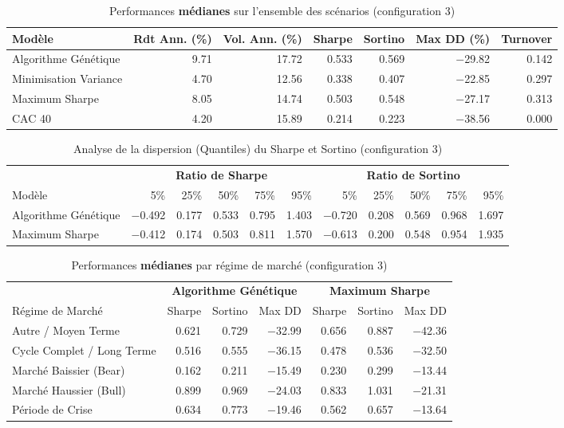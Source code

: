 \begin{table}[H]
\centering
\caption{Performances \textbf{médianes} sur l'ensemble des scénarios (configuration 3)\label{tab:overall_conf3}}
\footnotesize
\begin{tabular}{lrrrrrr}
\toprule
Modèle & \small Rdt Ann. (\%) & \small Vol. Ann. (\%) & \small Sharpe & \small Sortino & \small Max DD (\%) & \small Turnover \\
\midrule
Algorithme Génétique & 9.71 & 17.72 & 0.533 & 0.569 & $-$29.82 & 0.142 \\
Minimisation Variance & 4.70 & 12.56 & 0.338 & 0.407 & $-$22.85 & 0.297 \\
Maximum Sharpe & 8.05 & 14.74 & 0.503 & 0.548 & $-$27.17 & 0.313 \\
CAC 40 & 4.20 & 15.89 & 0.214 & 0.223 & $-$38.56 & 0.000 \\
\bottomrule
\end{tabular}
\end{table}

\begin{table}[H]
\centering
\caption{Analyse de la dispersion (Quantiles) du Sharpe et Sortino (configuration 3)\label{tab:quantiles_conf3}}
\footnotesize
\begin{tabular}{l|rrrrr|rrrrr}
\toprule
& \multicolumn{5}{c|}{\textbf{Ratio de Sharpe}} & \multicolumn{5}{c}{\textbf{Ratio de Sortino}} \\
Modèle & 5\% & 25\% & 50\% & 75\% & 95\% & 5\% & 25\% & 50\% & 75\% & 95\% \\
\midrule
Algorithme Génétique & $-$0.492 & 0.177 & 0.533 & 0.795 & 1.403 & $-$0.720 & 0.208 & 0.569 & 0.968 & 1.697 \\
Maximum Sharpe & $-$0.412 & 0.174 & 0.503 & 0.811 & 1.570 & $-$0.613 & 0.200 & 0.548 & 0.954 & 1.935 \\
\bottomrule
\end{tabular}
\end{table}

\begin{table}[H]
\centering
\caption{Performances \textbf{médianes} par régime de marché (configuration 3)\label{tab:regime_conf3}}
\footnotesize
\begin{tabular}{l|rrr|rrr}
\toprule
& \multicolumn{3}{c|}{\textbf{Algorithme Génétique}} & \multicolumn{3}{c}{\textbf{Maximum Sharpe}} \\
Régime de Marché & Sharpe & Sortino & Max DD & Sharpe & Sortino & Max DD \\
\midrule
Autre / Moyen Terme & 0.621 & 0.729 & $-$32.99 & 0.656 & 0.887 & $-$42.36 \\
Cycle Complet / Long Terme & 0.516 & 0.555 & $-$36.15 & 0.478 & 0.536 & $-$32.50 \\
Marché Baissier (Bear) & 0.162 & 0.211 & $-$15.49 & 0.230 & 0.299 & $-$13.44 \\
Marché Haussier (Bull) & 0.899 & 0.969 & $-$24.03 & 0.833 & 1.031 & $-$21.31 \\
Période de Crise & 0.634 & 0.773 & $-$19.46 & 0.562 & 0.657 & $-$13.64 \\
\bottomrule
\end{tabular}
\end{table}


